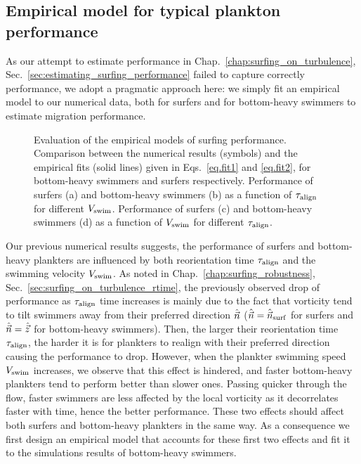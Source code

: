 \subsection{Empirical model for typical plankton performance}\label{sup:estimation}

As our attempt to estimate performance in Chap.~\ref{chap:surfing_on_turbulence}, Sec.~\ref{sec:estimating_surfing_performance} failed to capture correctly performance, we adopt a pragmatic approach here: we simply fit an empirical model to our numerical data, both for surfers and for bottom-heavy swimmers to estimate migration performance.
\begin{figure}
	\centering
	
	\caption[Evaluation of the empirical models of surfing performance.]{
		Evaluation of the empirical models of surfing performance.
		Comparison between the numerical results (symbols) and the empirical fits (solid lines) given in Eqs.~\eqref{eq.fit1} and \eqref{eq.fit2}, for bottom-heavy swimmers and surfers respectively.
	Performance of surfers (a) and bottom-heavy swimmers (b) as a function of $\tau_{\mathrm{align}}$ for different $V_{\mathrm{swim}}$.
	Performance of surfers (c) and bottom-heavy swimmers (d) as a function of $V_{\mathrm{swim}}$ for different $\tau_{\mathrm{align}}$.
	}
	\label{fig:surfing_empirical}
\end{figure}

Our previous numerical results suggests, the performance of surfers and bottom-heavy plankters are influenced by both reorientation time $\tau_{\mathrm{align}}$ and the swimming velocity $V_{\mathrm{swim}}$.
As noted in Chap.~\ref{chap:surfing_robustness}, Sec.~\ref{sec:surfing_on_turbulence_rtime}, the previously observed drop of performance as $\tau_{\mathrm{align}}$ time increases is mainly due to the fact that vorticity tend to tilt swimmers away from their preferred direction $\hat{\vec{n}}$ ($\hat{\vec{n}} = \hat{\vec{n}}_{\mathrm{surf}}$ for surfers and $\hat{\vec{n}} = \hat{\vec{z}}$ for bottom-heavy swimmers).
Then, the larger their reorientation time $\tau_{\mathrm{align}}$, the harder it is for plankters to realign with their preferred direction causing the performance to drop.
However, when the plankter swimming speed $V_{\mathrm{swim}}$ increases, we observe that this effect is hindered, and faster bottom-heavy plankters tend to perform better than slower ones.
Passing quicker through the flow, faster swimmers are less affected by the local vorticity as it decorrelates faster with time, hence the better performance.
These two effects should affect both surfers and bottom-heavy plankters in the same way.
As a consequence we first design an empirical model that accounts for these first two effects and fit it to the simulations results of bottom-heavy swimmers.

